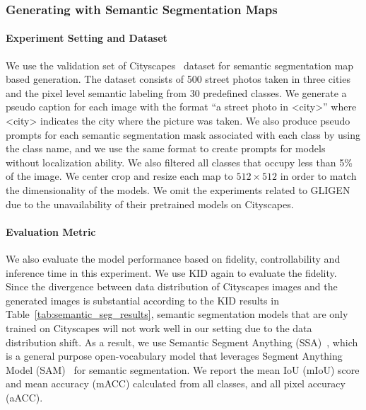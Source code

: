 \subsubsection{Generating with Semantic Segmentation Maps}
\paragraph{Experiment Setting and Dataset}
We use the validation set of Cityscapes~\citep{cityscapes} dataset for semantic segmentation map based generation. The dataset consists of 500 street photos taken in three cities and the pixel level semantic labeling from 30 predefined classes. We generate a pseudo caption for each image with the format ``a street photo in <city>'' where <city> indicates the city where the picture was taken. We also produce pseudo prompts for each semantic segmentation mask associated with each class by using the class name, and we use the same format to create prompts for models without localization ability. We also filtered all classes that occupy less than 5\% of the image. We center crop and resize each map to $512\times 512$ in order to match the dimensionality of the models. We omit the experiments related to GLIGEN due to the unavailability of their pretrained models on Cityscapes.
\paragraph{Evaluation Metric}
We also evaluate the model performance based on fidelity, controllability and inference time in this experiment. We use KID again to evaluate the fidelity. Since the divergence between data distribution of Cityscapes images and the generated images is substantial according to the KID results in Table~\ref{tab:semantic_seg_results}, semantic segmentation models that are only trained on Cityscapes will not work well in our setting due to the data distribution shift. As a result, we use Semantic Segment Anything (SSA)~\citep{ssa}, which is a general purpose open-vocabulary model that leverages Segment Anything Model (SAM)~\citep{sam} for semantic segmentation. We report the mean IoU (mIoU) score and mean accuracy (mACC) calculated from all classes, and all pixel accuracy (aACC).
